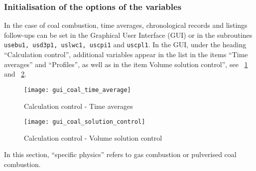 {{\subsubsection{Initialisation of the options of the variables}
In the case of coal combustion, time averages, chronological records and listings follow-ups can be set in the Graphical User Interface (GUI) or in the subroutines \texttt{usebu1, usd3p1, uslwc1, uscpi1} and \texttt{uscpl1}. In the GUI, under the heading ``Calculation control'', additional variables appear in the list in the items ``Time averages'' and ``Profiles'', as well as in the item Volume solution control'', see \figurename~\ref{fig:t_average-coal} and \figurename~\ref{fig:V_control-coal}.

\begin{figure}[!ht]
\begin{center}
\texttt{[image: gui\_coal\_time\_average]}
\caption{Calculation control - Time averages}
\label{fig:t_average-coal}
\end{center}
\end{figure}

\begin{figure}[!ht]
\begin{center}
\texttt{[image: gui\_coal\_solution\_control]}
\caption{Calculation control - Volume solution control}
\label{fig:V_control-coal}
\end{center}
\end{figure}

In this section, ``specific physics'' refers to gas combustion or
pulverised coal combustion.

}}
